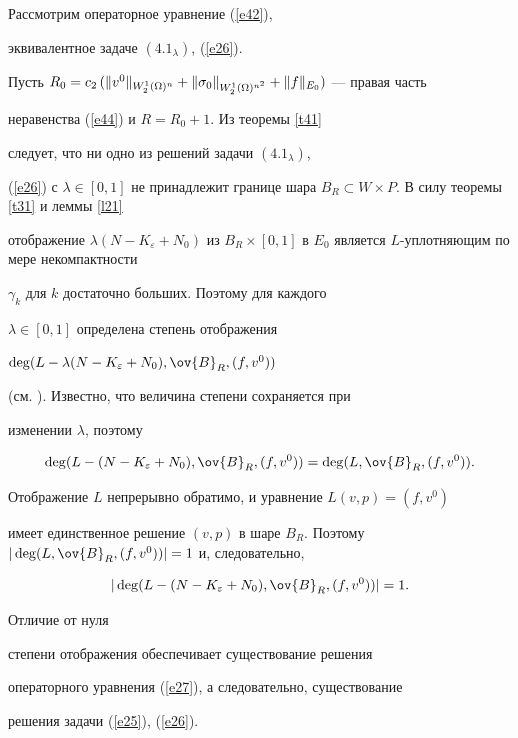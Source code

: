 \begin{pf}


Рассмотрим операторное уравнение (\ref{e42}),


эквивалентное задаче $(4.1_{\lambda})$, (\ref{e26}).


Пусть $R_0=c_2\,(\|v^0\|_{W^1_2(\Om)^n} +


\|\sig_0\|_{W^1_2(\Om)^{n^2}}+\|f\|_{E_0})$ --- правая часть


неравенства (\ref{e44}) и $R=R_0+1$. Из теоремы \ref{t41}


следует, что ни одно из решений задачи $(4.1_{\lambda})$,


(\ref{e26}) с $\lambda\in [0,1]$ не принадлежит границе шара $B_R


\subset W \times P$. В силу теоремы \ref{t31} и леммы \ref{l21}


отображение $\lambda (N-K_{\varepsilon}+N_0)$ из $B_R \times


[0,1]$ в $E_0$ является $L$-уплотняющим по мере некомпактности


$\gamma_k$ для $k$ достаточно больших. Поэтому для каждого


$\lambda \in [0,1]$ определена степень отображения


$\deg(L-\lambda (N-K_{\varepsilon}+N_0), \ov{B}_R,(f,v^0))$


(см. \cite{ZvDm3}). Известно, что величина степени сохраняется при


изменении $\lambda$, поэтому


$$


\deg(L-(N-K_{\varepsilon}+N_0), \ov{B}_R,(f,v^0))=


\deg(L, \ov{B}_R,(f,v^0)).


$$


Отображение $L$ непрерывно обратимо, и уравнение $L(v,p)=(f,v^0)$


имеет единственное решение $(v,p)$ в шаре $B_R$. Поэтому $|\deg(L,


\ov{B}_R,(f,v^0))|=1$ и, следовательно,


$$


|\deg(L-(N -K_{\varepsilon}+N_0), \ov{B}_R,(f,v^0))|=1.


$$


Отличие от нуля


степени отображения обеспечивает существование решения


операторного уравнения (\ref{e27}), а следовательно, существование


решения задачи (\ref{e25}), (\ref{e26}).


\end{pf}








